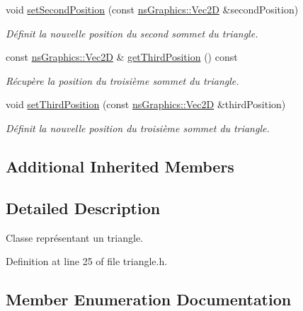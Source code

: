 \begin{DoxyCompactItemize}
void \hyperlink{classns_shape_1_1_triangle_a18f911ec00c99e29eec695a49c2e051e}{set\+Second\+Position} (const \hyperlink{classns_graphics_1_1_vec2_d}{ns\+Graphics\+::\+Vec2D} \&second\+Position)
\begin{DoxyCompactList}\small\item\em Définit la nouvelle position du second sommet du triangle. \end{DoxyCompactList}\item 
const \hyperlink{classns_graphics_1_1_vec2_d}{ns\+Graphics\+::\+Vec2D} \& \hyperlink{classns_shape_1_1_triangle_a8ff04f062cf1dcb119f9e814ce8f943a}{get\+Third\+Position} () const
\begin{DoxyCompactList}\small\item\em Récupère la position du troisième sommet du triangle. \end{DoxyCompactList}\item 
void \hyperlink{classns_shape_1_1_triangle_a7af3264cac9e8333ec5d7315bc931047}{set\+Third\+Position} (const \hyperlink{classns_graphics_1_1_vec2_d}{ns\+Graphics\+::\+Vec2D} \&third\+Position)
\begin{DoxyCompactList}\small\item\em Définit la nouvelle position du troisième sommet du triangle. \end{DoxyCompactList}\end{DoxyCompactItemize}
\subsection*{Additional Inherited Members}


\subsection{Detailed Description}
Classe représentant un triangle. 

Definition at line 25 of file triangle.\+h.



\subsection{Member Enumeration Documentation}
\mbox{\label{classns_shape_1_1_triangle_adef21dd21ed3b5e4aa378f264abbe758}} 
